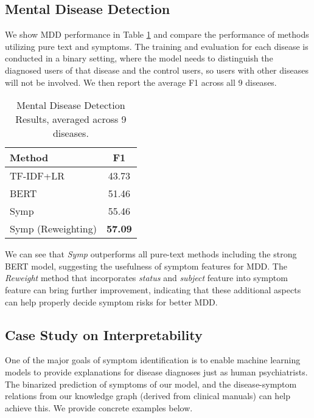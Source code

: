 \subsection{Mental Disease Detection}

We show MDD performance in Table \ref{tab:disease} and compare the performance of methods utilizing pure text and symptoms. The training and evaluation for each disease is conducted in a binary setting, where the model needs to distinguish the diagnosed users of that disease and the control users, so users with other diseases will not be involved. We then report the average F1 across all 9 diseases. 

\begin{table}[h]
    \small
    \centering
    \begin{tabular}{lc}
        \hline
        Method          & F1             \\
        \hline
        TF-IDF+LR       & 43.73          \\
        BERT \citep{nguyen2022improving}        & 51.46          \\
        \hline
        Symp            & 55.46          \\
        Symp (Reweighting) & \textbf{57.09} \\
        \hline
    \end{tabular}
    \caption{Mental Disease Detection Results, averaged across 9 diseases.}
    \label{tab:disease}
\end{table}

We can see that \textit{Symp} outperforms all pure-text methods including the strong BERT model, suggesting the usefulness of symptom features for MDD. The \textit{Reweight} method that incorporates \textit{status} and \textit{subject} feature into symptom feature can bring further improvement, indicating that these additional aspects can help properly decide symptom risks for better MDD. 

\subsection{Case Study on Interpretability}
\label{sec:interpret}

One of the major goals of symptom identification is to enable machine learning models to provide explanations for disease diagnoses just as human psychiatrists. The binarized prediction of symptoms of our model, and the disease-symptom relations from our knowledge graph (derived from clinical manuals) can help achieve this. We provide concrete examples below. 

